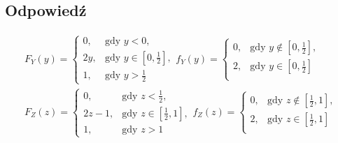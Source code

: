 \subsection*{Odpowiedź}
\[
	\boxed{
		\begin{aligned}
			F_Y(y) =
			\begin{cases}
				0,  & \text{gdy } y < 0,                \\
				2y, & \text{gdy } y\in [0,\frac{1}{2}], \\
				1,  & \text{gdy } y > \frac{1}{2}
			\end{cases}
			f_Y(y) =
			\begin{cases}
				0, & \text {gdy } y \notin [0,\frac{1}{2}], \\
				2, & \text {gdy } y \in [0,\frac{1}{2}]     \\
			\end{cases}
			\\[5pt]
			F_Z(z) =
			\begin{cases}
				0,    & \text{gdy } z < \frac{1}{2},      \\
				2z-1, & \text{gdy } z\in [\frac{1}{2},1], \\
				1,    & \text{gdy } z > 1
			\end{cases}
			f_Z(z) =
			\begin{cases}
				0, & \text{gdy } z \notin [\frac{1}{2}, 1], \\
				2, & \text{gdy } z \in [\frac{1}{2}, 1]     \\
			\end{cases}
		\end{aligned}
	}
\]
